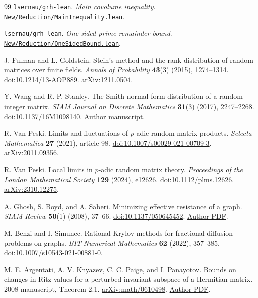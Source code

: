\begin{thebibliography}{99}
\texttt{lsernau/grh-lean}.
\emph{Main covolume inequality}.
\href{https://github.com/VladimirReshetnikov/ProveIt/blob/3d8689ceae76501a5c50f67da37e85369aac4fb6/Analysis/GeneralizedRiemannHypothesis/vendor/grh-lean/grh/src/New/Reduction/MainInequality.lean}{\texttt{New/Reduction/MainInequality.lean}}.

\texttt{lsernau/grh-lean}.
\emph{One-sided prime-remainder bound}.
\href{https://github.com/VladimirReshetnikov/ProveIt/blob/3d8689ceae76501a5c50f67da37e85369aac4fb6/Analysis/GeneralizedRiemannHypothesis/vendor/grh-lean/grh/src/New/Reduction/OneSidedBound.lean}{\texttt{New/Reduction/OneSidedBound.lean}}.

J. Fulman and L. Goldstein.
Stein's method and the rank distribution of random matrices over finite fields.
\emph{Annals of Probability} \textbf{43}(3) (2015), 1274--1314.
\href{https://doi.org/10.1214/13-AOP889}{doi:10.1214/13-AOP889}.
\href{https://arxiv.org/abs/1211.0504}{arXiv:1211.0504}.

Y. Wang and R. P. Stanley.
The Smith normal form distribution of a random integer matrix.
\emph{SIAM Journal on Discrete Mathematics} \textbf{31}(3) (2017), 2247--2268.
\href{https://doi.org/10.1137/16M1098140}{doi:10.1137/16M1098140}.
\href{https://math.mit.edu/~rstan/papers/randomsnf.pdf}{Author manuscript}.

R. Van Peski.
Limits and fluctuations of \(p\)-adic random matrix products.
\emph{Selecta Mathematica} \textbf{27} (2021), article 98.
\href{https://doi.org/10.1007/s00029-021-00709-3}{doi:10.1007/s00029-021-00709-3}.
\href{https://arxiv.org/abs/2011.09356}{arXiv:2011.09356}.

R. Van Peski.
Local limits in \(p\)-adic random matrix theory.
\emph{Proceedings of the London Mathematical Society} \textbf{129} (2024), e12626.
\href{https://doi.org/10.1112/plms.12626}{doi:10.1112/plms.12626}.
\href{https://arxiv.org/abs/2310.12275}{arXiv:2310.12275}.

A. Ghosh, S. Boyd, and A. Saberi.
Minimizing effective resistance of a graph.
\emph{SIAM Review} \textbf{50}(1) (2008), 37--66.
\href{https://doi.org/10.1137/050645452}{doi:10.1137/050645452}.
\href{https://web.stanford.edu/~boyd/papers/pdf/eff_res.pdf}{Author PDF}.

M. Benzi and I. Simunec.
Rational Krylov methods for fractional diffusion problems on graphs.
\emph{BIT Numerical Mathematics} \textbf{62} (2022), 357--385.
\href{https://doi.org/10.1007/s10543-021-00881-0}{doi:10.1007/s10543-021-00881-0}.

M. E. Argentati, A. V. Knyazev, C. C. Paige, and I. Panayotov.
Bounds on changes in Ritz values for a perturbed invariant subspace of a
Hermitian matrix. 2008 manuscript, Theorem 2.1.
\href{https://arxiv.org/abs/math/0610498}{arXiv:math/0610498}.
\href{https://www.cs.mcgill.ca/~chris/pub/ArgKPP08.pdf}{Author PDF}.
\end{thebibliography}
